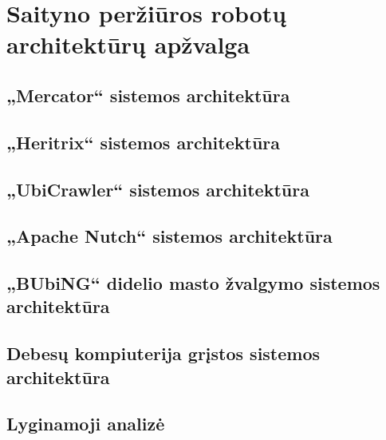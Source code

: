 \section{Saityno peržiūros robotų architektūrų apžvalga}
\subsection{„Mercator“ sistemos architektūra}
\subsection{„Heritrix“ sistemos architektūra}
\subsection{„UbiCrawler“ sistemos architektūra}
\subsection{„Apache Nutch“ sistemos architektūra}
\subsection{„BUbiNG“ didelio masto žvalgymo sistemos architektūra}
\subsection{Debesų kompiuterija grįstos sistemos architektūra}
\subsection{Lyginamoji analizė}